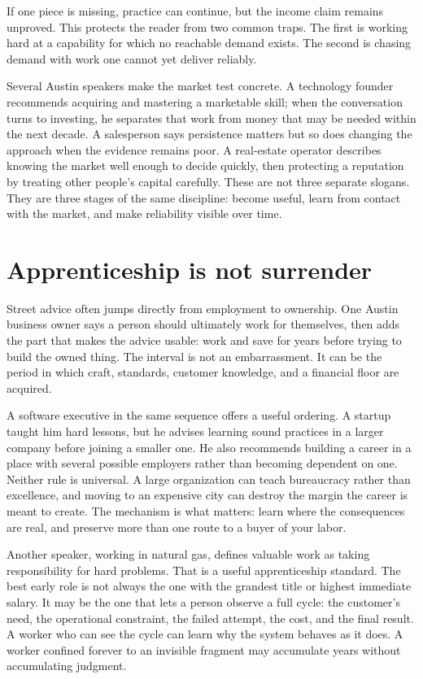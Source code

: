 If one piece is missing, practice can continue, but the income claim remains
unproved. This protects the reader from two common traps. The first is working
hard at a capability for which no reachable demand exists. The second is
chasing demand with work one cannot yet deliver reliably.

Several Austin speakers make the market test concrete. A technology founder
recommends acquiring and mastering a marketable skill; when the conversation
turns to investing, he separates that work from money that may be needed within
the next decade. A salesperson says persistence matters but so does changing
the approach when the evidence remains poor. A real-estate operator describes
knowing the market well enough to decide quickly, then protecting a reputation
by treating other people's capital carefully. These are not three separate
slogans. They are three stages of the same discipline: become useful, learn
from contact with the market, and make reliability visible over time.

\section{Apprenticeship is not surrender}

Street advice often jumps directly from employment to ownership. One Austin
business owner says a person should ultimately work for themselves, then adds
the part that makes the advice usable: work and save for years before trying to
build the owned thing. The interval is not an embarrassment. It can be the
period in which craft, standards, customer knowledge, and a financial floor are
acquired.

A software executive in the same sequence offers a useful ordering. A startup
taught him hard lessons, but he advises learning sound practices in a larger
company before joining a smaller one. He also recommends building a career in
a place with several possible employers rather than becoming dependent on one.
Neither rule is universal. A large organization can teach bureaucracy rather
than excellence, and moving to an expensive city can destroy the margin the
career is meant to create. The mechanism is what matters: learn where the
consequences are real, and preserve more than one route to a buyer of your
labor.

Another speaker, working in natural gas, defines valuable work as taking
responsibility for hard problems. That is a useful apprenticeship standard.
The best early role is not always the one with the grandest title or highest
immediate salary. It may be the one that lets a person observe a full cycle:
the customer's need, the operational constraint, the failed attempt, the cost,
and the final result. A worker who can see the cycle can learn why the system
behaves as it does. A worker confined forever to an invisible fragment may
accumulate years without accumulating judgment.

